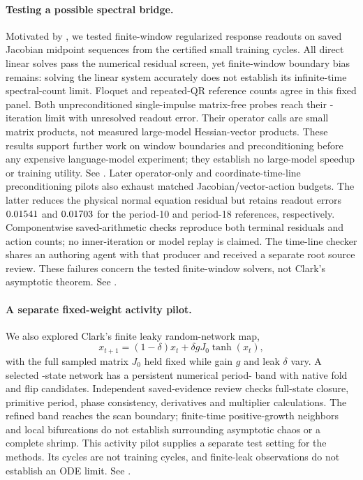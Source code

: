 \documentclass[11pt,letterpaper]{article}
\begin{document}
\paragraph{Testing a possible spectral bridge.} Motivated by
\citet{clark2026lyapunov}, we tested finite-window regularized response readouts
on saved Jacobian midpoint sequences from the certified small training cycles.
All \nClarkResponseSolves{} direct linear solves pass the numerical residual
screen, yet finite-window boundary bias remains: solving the linear system
accurately does not establish its infinite-time spectral-count limit. Floquet
and repeated-QR reference counts agree in this fixed panel. Both unpreconditioned
single-impulse matrix-free probes reach their \nClarkResponseIterations{}-iteration
limit with unresolved readout error. Their operator calls are small matrix
products, not measured large-model Hessian-vector products. These results support
further work on window boundaries and preconditioning before any expensive
language-model experiment; they establish no large-model speedup or training
utility. See .
Later operator-only and coordinate-time-line preconditioning pilots also exhaust
matched Jacobian/vector-action budgets. The latter reduces the physical normal
equation residual but retains readout errors $0.01541$ and
$0.01703$ for the period-10 and period-18 references,
respectively. Componentwise saved-arithmetic checks reproduce both terminal
residuals and action counts; no inner-iteration or model replay is claimed.
The time-line checker shares an authoring agent with that producer and received
a separate root source review. These failures concern the tested finite-window
solvers, not Clark's asymptotic theorem. See
.

\paragraph{A separate fixed-weight activity pilot.} We also explored Clark's
finite leaky random-network map,
\[
 x_{t+1}=(1-\delta)x_t+\delta gJ_0\tanh(x_t),
\]
with the full sampled matrix $J_0$ held fixed while gain $g$ and leak $\delta$
vary. A selected \nClarkRNNDimension{}-state network has a persistent numerical
period-\nClarkRNNPeriod{} band with native fold and flip candidates. Independent
saved-evidence review checks full-state closure, primitive period, phase
consistency, derivatives and multiplier calculations. The refined band reaches
the scan boundary; finite-time positive-growth neighbors and local bifurcations
do not establish surrounding asymptotic chaos or a complete shrimp. This activity
pilot supplies a separate test setting for the methods. Its cycles are not
training cycles, and finite-leak observations do not establish an ODE limit.
See .
\end{document}
